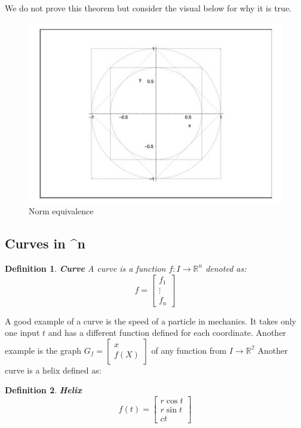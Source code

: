 \documentclass[titlepage]{article}
\newtheorem{definition}{Definition}
\newcommand{\Rn}{\mathbb{R}^n}
\begin{document}
We do not prove this theorem but consider the visual below for why it is true. 
\begin{figure}[H]
    \centering
    \includegraphics[scale = 0.4]{src/normEQ.JPG}
    \caption{Norm equivalence}
    \label{fig:my_label}
\end{figure}

\subsection{Curves in \Rn}
\begin{definition}\textbf{Curve}
A curve is a function $f: I \to \Rn$ denoted as:
$$f = \begin{bmatrix}
f_{1}\\
\vdots \\
f_{n}
\end{bmatrix}$$
\end{definition}

A good example of a curve is the speed of a particle in mechanics. It takes only one input $t$ and has a different function defined for each coordinate. Another example is the graph $G_{f} = \begin{bmatrix}
x\\
f(X)
\end{bmatrix}$ of any function from $I \to \mathbb{R^{2}}$
Another curve is a helix defined as:
\begin{definition}\textbf{Helix}
$$f(t) = \begin{bmatrix}
r\cos{t}\\
r\sin{t}\\
ct
\end{bmatrix}$$
\end{definition}
\end{document}
